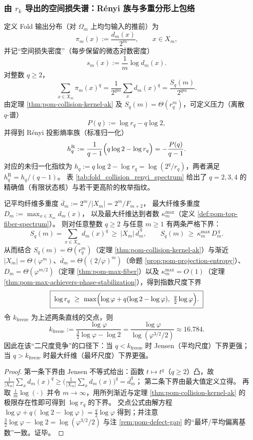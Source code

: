 \subsubsection{由 \texorpdfstring{$r_k$}{rk} 导出的空间损失谱：Rényi 族与多重分形上包络}\label{subsec:pom-multifractal-from-rk}
定义 Fold 输出分布（对 $\Omega_m$ 上均匀输入的推前）为
\[
\pi_m(x):=\frac{d_m(x)}{2^m},\qquad x\in X_m,
\]
并记“空间损失密度”（每步保留的微态对数密度）
\[
s_m(x):=\frac{1}{m}\log d_m(x).
\]
对整数 $q\ge 2$，
\[
\sum_{x\in X_m}\pi_m(x)^q
=\frac{1}{2^{qm}}\sum_x d_m(x)^q
=\frac{S_q(m)}{2^{qm}}.
\]
由定理 \ref{thm:pom-collision-kernel-ak} 及 $S_q(m)=\Theta(r_q^m)$，可定义压力（离散 $q$-谱）
\[
P(q):=\log r_q-q\log 2,
\]
并得到 Rényi 投影熵率族（标准归一化）
\[
h_q^{\mathrm{R}}:=\frac{1}{q-1}\Bigl(q\log 2-\log r_q\Bigr)= -\frac{P(q)}{q-1}.
\]
对应的未归一化指纹为 \(h_q:=q\log 2-\log r_q=\log(2^q/r_q)\)，两者满足 \(h_q^{\mathrm{R}}=h_q/(q-1)\)。
表 \ref{tab:fold_collision_renyi_spectrum} 给出了 $q=2,3,4$ 的精确值（有限状态核）与若干更高阶的枚举指纹。

\begin{proposition}[两尺度下界与候选冻结阈值]\label{prop:pom-freeze-threshold}
记平均纤维多重度
\(
\overline d_m:=2^m/|X_m|=2^m/F_{m+2}
\)，
最大纤维多重度
\(
D_m:=\max_{x\in X_m}d_m(x)
\)，
以及最大纤维达到者数 \(\kappa_m^{\mathrm{max}}\)（定义 \ref{def:pom-top-fiber-spectrum}）。
则对任意整数 \(q\ge 2\) 与任意 \(m\ge 1\) 有两条严格下界：
\[
S_q(m)=\sum_{x\in X_m}d_m(x)^q\ \ge\ |X_m|\,\overline d_m^{\,q},
\qquad
S_q(m)\ \ge\ \kappa_m^{\mathrm{max}}\,D_m^{\,q}.
\]
从而结合 \(S_q(m)=\Theta(r_q^m)\)（定理 \ref{thm:pom-collision-kernel-ak}）与渐近
\(|X_m|=\Theta(\varphi^m)\)、\(\overline d_m=\Theta((2/\varphi)^m)\)（命题 \ref{prop:pom-projection-entropy}）、
\(D_m=\Theta(\varphi^{m/2})\)（定理 \ref{thm:pom-max-fiber}）以及 \(\kappa_m^{\mathrm{max}}=O(1)\)（定理 \ref{thm:pom-max-achievers-phase-stabilization}），得到指数尺度下界
\[
\boxed{\;
\log r_q\ \ge\ \max\Bigl(\log\varphi+q(\log 2-\log\varphi),\ \tfrac{q}{2}\log\varphi\Bigr).\;}
\]
令 \(k_{\mathrm{freeze}}\) 为上述两条直线的交点，则
\[
\boxed{\;
k_{\mathrm{freeze}}
:=\frac{\log\varphi}{\tfrac32\log\varphi-\log 2}
=\frac{\log\varphi}{\log(\varphi^{3/2}/2)}
\approx 16.784. \;}
\]
因此在该“二尺度竞争”的口径下：当 \(q<k_{\mathrm{freeze}}\) 时 Jensen（平均尺度）下界更强；当 \(q>k_{\mathrm{freeze}}\) 时最大纤维（最坏尺度）下界更强。
\end{proposition}
\begin{proof}
第一条下界由 Jensen 不等式给出：函数 \(t\mapsto t^q\)（\(q\ge 2\)）凸，故
\(
\frac1{|X_m|}\sum_x d_m(x)^q\ge \bigl(\frac1{|X_m|}\sum_x d_m(x)\bigr)^q=\overline d_m^q
\)；
第二条下界由最大值定义立得。
再取 \(\frac1m\log(\cdot)\) 并令 \(m\to\infty\)，用所列渐近与定理 \ref{thm:pom-collision-kernel-ak} 的极限存在性即可得到 \(\log r_q\) 的下界。
交点公式由解方程
\(
\log\varphi+q(\log 2-\log\varphi)=\frac{q}{2}\log\varphi
\)
得到；并注意 \(\tfrac32\log\varphi-\log2=\log(\varphi^{3/2}/2)\) 与注 \ref{rem:pom-defect-gap} 的“最坏/平均偏离基数”一致。证毕。
\end{proof}

